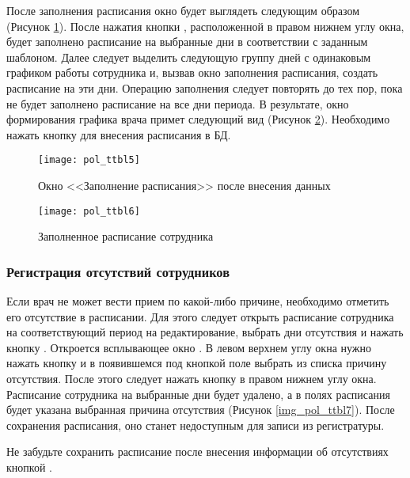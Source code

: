 После заполнения расписания окно будет выглядеть следующим образом (Рисунок \ref{img_pol_ttbl5}). После нажатия кнопки , расположенной в правом нижнем углу окна, будет заполнено расписание на выбранные дни в соответствии с заданным шаблоном. Далее следует выделить следующую группу дней с одинаковым графиком работы сотрудника и, вызвав окно заполнения расписания, создать расписание на эти дни. Операцию заполнения следует повторять до тех пор, пока не будет заполнено расписание на все дни периода. В результате, окно формирования графика врача примет следующий вид (Рисунок \ref{img_pol_ttbl6}). Необходимо нажать кнопку  для внесения расписания в БД. 

\begin{figure}[ht]\centering
 \texttt{[image: pol\_ttbl5]}
 \caption{Окно <<Заполнение расписания>> после внесения данных}
 \label{img_pol_ttbl5}
\end{figure}

\begin{figure}[ht]\centering
 \texttt{[image: pol\_ttbl6]}
 \caption{Заполненное расписание сотрудника}
 \label{img_pol_ttbl6}
\end{figure}

\subsubsection{Регистрация отсутствий сотрудников}

Если врач не может вести прием по какой-либо причине, необходимо отметить его отсутствие в расписании. Для этого следует открыть расписание сотрудника на соответствующий период на редактирование, выбрать дни отсутствия и нажать кнопку . Откроется всплывающее окно . В левом верхнем углу окна нужно нажать кнопку  и в появившемся под кнопкой поле выбрать из списка причину отсутствия. После этого следует нажать кнопку  в правом нижнем углу окна. Расписание сотрудника на выбранные дни будет удалено, а в полях расписания будет указана выбранная причина отсутствия (Рисунок \ref{img_pol_ttbl7}). После сохранения расписания, оно станет недоступным для записи из регистратуры.

\begin{vnim}
 Не забудьте сохранить расписание после внесения информации об отсутствиях кнопкой .
\end{vnim} 

